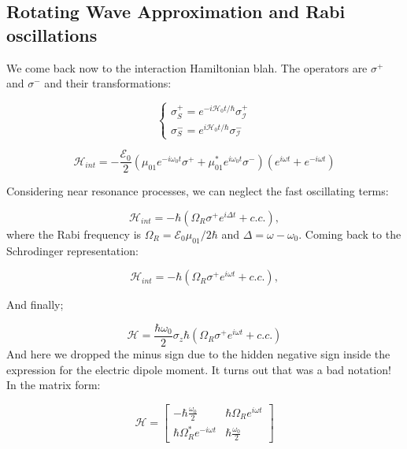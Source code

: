 \subsection{Rotating Wave Approximation and Rabi oscillations}

We come back now to the interaction Hamiltonian blah. The operators are $\sigma^{+}$ and $\sigma^{-}$ and their transformations:

\begin{equation}
\begin{cases}
    \sigma^{+}_{S} = e^{- i \mathcal{H}_{0} t / \hbar} \sigma^{+}_{\mathcal{I}}\\
    \sigma^{-}_{S} = e^{i \mathcal{H}_{0} t / \hbar} \sigma^{-}_{\mathcal{I}}
\end{cases}
\end{equation}

\begin{equation}
    \mathcal{H}_{int} = - \frac{\mathcal{E}_{0}}{2} (\mu _{01} e^{-i \omega_{0} t}\sigma^{+} + \mu _{01}^{*} e^{i \omega_{0} t}\sigma^{-}) ( e^{i \omega t} + e^{ - i \omega t})
\end{equation}

Considering near resonance processes, we can neglect the fast oscillating terms:

\begin{equation}
    \mathcal{H}_{int} = - \hbar( \Omega_{R} \sigma^{+} e^{i \Delta t} + c.c.),
\end{equation}
where the Rabi frequency is $\Omega_{R} = \mathcal{E}_{0} \mu_{01} / 2\hbar$ and $\Delta = \omega - \omega_{0}$. Coming back to the Schrodinger representation:

\begin{equation}
    \mathcal{H}_{int} = - \hbar( \Omega_{R} \sigma^{+} e^{i \omega t} + c.c.),
\end{equation}

And finally;

\begin{equation}
    \mathcal{H} = \frac {\hbar \omega_{0}}{2} \sigma_{z}  \hbar( \Omega_{R} \sigma^{+} e^{i \omega t} + c.c.)
\end{equation}
And here we dropped the minus sign due to the hidden negative sign inside the expression for the electric dipole moment. It turns out that was a bad notation!
In the matrix form:

\[
\mathcal{H} =
  \begin{bmatrix}
    -\hbar \frac {\omega_{0}}{2} & \hbar \Omega_{R}  e^{i \omega t}  \\
    \hbar \Omega_{R}^{*}  e^{-i \omega t} & \hbar \frac {\omega_{0}}{2}
  \end{bmatrix}
\]